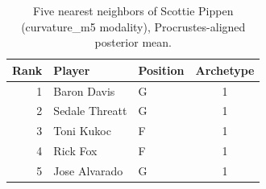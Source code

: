\begin{table}[htbp]
  \centering\small
  \begin{tabular}{rllc}
    \toprule
    Rank & Player & Position & Archetype \\
    \midrule
    1 & Baron Davis & G & 1 \\
    2 & Sedale Threatt & G & 1 \\
    3 & Toni Kukoc & F & 1 \\
    4 & Rick Fox & F & 1 \\
    5 & Jose Alvarado & G & 1 \\
    \bottomrule
  \end{tabular}
  \caption{Five nearest neighbors of Scottie Pippen (curvature_m5 modality), Procrustes-aligned posterior mean.}
  \label{tab:Scottie_Pippen_neighbors_curvature_m5}
\end{table}


